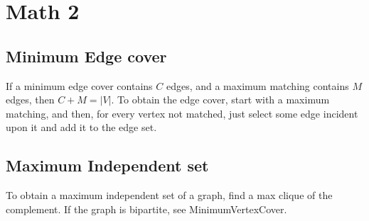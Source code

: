 \section{Math 2}
	\subsection{Minimum Edge cover}
  If a minimum edge cover contains $C$ edges, and a maximum matching contains $M$ edges, then $C+M = |V|$. To obtain
  the edge cover, start with a maximum matching, and then, for every vertex not matched, just select some edge
  incident upon it and add it to the edge set.

	\subsection{Maximum Independent set}
  To obtain a maximum independent set of a graph, find a max
  clique of the complement. If the graph is bipartite, see MinimumVertexCover.
